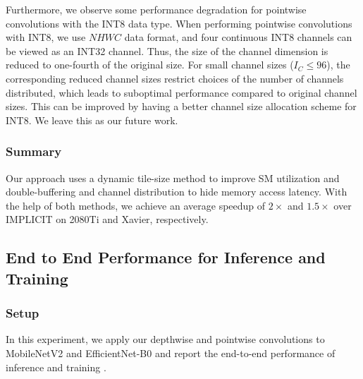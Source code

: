 Furthermore, we observe some performance degradation for pointwise convolutions with the INT8 data type. When performing pointwise
convolutions with INT8, we use $NHWC$ data format, and four continuous INT8 channels can be viewed as an INT32 channel. Thus, the size of
the channel dimension is reduced to one-fourth of the original size. For small channel sizes ($I_C \leq 96$), the corresponding reduced channel
sizes restrict choices of the number of channels distributed, which leads to suboptimal performance compared to original channel sizes.
This can be improved by having a better channel size allocation scheme for INT8. We leave this as our future work.


\subsubsection{Summary} Our approach uses a dynamic tile-size method to improve SM utilization and double-buffering and channel distribution to hide
memory access latency. With the help of both methods, we achieve an average speedup of $2\times$ and $1.5\times$ over IMPLICIT on
2080Ti and Xavier, respectively.





\subsection{End to End Performance for Inference and Training}
\label{sec:inferexp}
\subsubsection{Setup}
In this experiment, we apply our depthwise and pointwise convolutions to MobileNetV2 and EfficientNet-B0 and report the end-to-end performance of inference and training .

